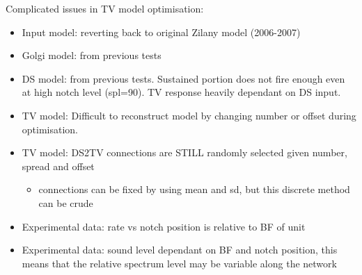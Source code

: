 








Complicated issues in TV model optimisation:
\begin{itemize}
\item Input model: reverting back to original Zilany model (2006-2007)
\item Golgi model: from previous tests 
\item DS model: from previous tests.  Sustained portion does not fire enough
  even at high notch level (spl=90).  TV response heavily dependant on DS input.
\item TV model: Difficult to reconstruct model by changing number or offset
  during optimisation.
\item TV model: DS2TV connections are STILL randomly selected given number,
  spread and offset
  \begin{itemize}
  \item connections can be fixed by using mean and sd, but this discrete method can be crude
  \end{itemize}
\item Experimental data: rate vs notch position is relative to BF of unit
\item Experimental data: sound level dependant on BF and notch position, this
  means that the relative spectrum level may be variable along the network
\end{itemize}

